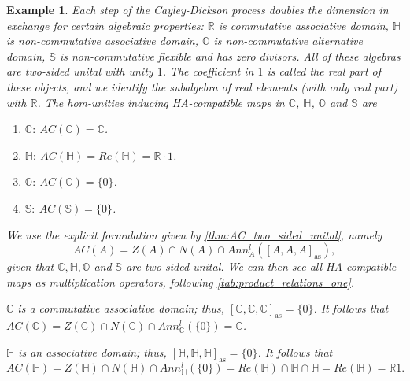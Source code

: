 \documentclass[12pt]{article}
\newtheorem{example}[theorem]{Example}
\begin{document}
\begin{example}
			Each step of the Cayley-Dickson process doubles the dimension in exchange for certain algebraic properties: $\mathbb{R}$ is commutative associative domain, $\mathbb{H}$ is non-commutative associative domain, $\mathbb{O}$ is non-commutative alternative domain, $\mathbb{S}$ is non-commutative flexible and has zero divisors. All of these algebras are two-sided unital with unity $1$. The coefficient in $1$ is called the \emph{real part} of these objects, and we identify the subalgebra of \emph{real} elements (with only real part) with $\mathbb{R}$.
			The hom-unities inducing HA-compatible maps in $\mathbb{C}$, $\mathbb{H}$, $\mathbb{O}$ and $\mathbb{S}$ are
			\begin{enumerate}[label=\textnormal{\arabic*)}]
				\item $\mathbb{C}\colon\ AC(\mathbb{C})=\mathbb{C}$.
				\item $\mathbb{H}\colon\ AC(\mathbb{H})=Re(\mathbb{H})=\mathbb{R}\cdot 1$.
				\item $\mathbb{O}\colon\ AC(\mathbb{O})=\{0\}$.
				\item $\mathbb{S}:\ AC(\mathbb{S})=\{0\}$.
			\end{enumerate}
			
			We use the explicit formulation given by \cref{thm:AC_two_sided_unital}, namely
			\begin{equation*}
				AC(A)=Z(A)\cap N(A)\cap Ann_A^l([A,A,A]_{\mathrm{as}}),
			\end{equation*}
			given that $\mathbb{C}, \mathbb{H},\mathbb{O}$ and $\mathbb{S}$ are two-sided unital. We can then see all HA-compatible maps as multiplication operators, following \cref{tab:product_relations_one}.
			
			$\mathbb{C}$ is a commutative associative domain; thus, $[\mathbb{C},\mathbb{C},\mathbb{C}]_{\mathrm{as}}=\{0\}$. It follows that $AC(\mathbb{C})=Z(\mathbb{C})\cap N(\mathbb{C})\cap Ann_\mathbb{C}^l(\{0\})=\mathbb{C}$.
			
			$\mathbb{H}$ is an associative domain; thus, $[\mathbb{H},\mathbb{H},\mathbb{H}]_{\mathrm{as}}=\{0\}$. It follows that $$AC(\mathbb{H})=Z(\mathbb{H})\cap N(\mathbb{H})\cap Ann_\mathbb{H}^l(\{0\})=Re(\mathbb{H})\cap \mathbb{H}\cap \mathbb{H}=Re(\mathbb{H})=\mathbb{R}1.$$
			

\end{example}
\end{document}

